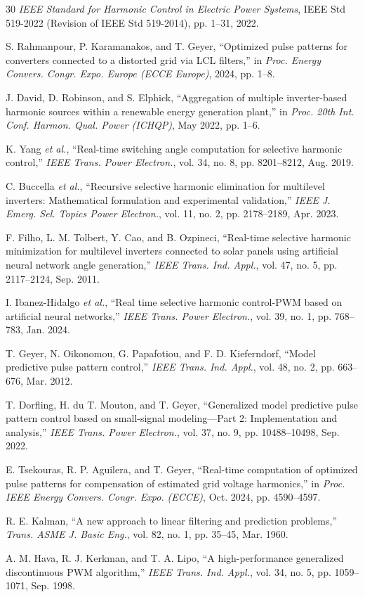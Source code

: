\documentclass[conference]{IEEEtran}
\begin{document}
\begin{thebibliography}{30}
\emph{IEEE Standard for Harmonic Control in Electric Power Systems}, IEEE Std
519-2022 (Revision of IEEE Std 519-2014), pp. 1--31, 2022.

S. Rahmanpour, P. Karamanakos, and T. Geyer, ``Optimized pulse patterns for
converters connected to a distorted grid via LCL filters,'' in \emph{Proc.
Energy Convers. Congr. Expo. Europe (ECCE Europe)}, 2024, pp. 1--8.

J. David, D. Robinson, and S. Elphick, ``Aggregation of multiple inverter-based
harmonic sources within a renewable energy generation plant,'' in \emph{Proc.
20th Int. Conf. Harmon. Qual. Power (ICHQP)}, May 2022, pp. 1--6.

K. Yang \emph{et al.}, ``Real-time switching angle computation for selective
harmonic control,'' \emph{IEEE Trans. Power Electron.}, vol. 34, no. 8,
pp. 8201--8212, Aug. 2019.

C. Buccella \emph{et al.}, ``Recursive selective harmonic elimination for
multilevel inverters: Mathematical formulation and experimental validation,''
\emph{IEEE J. Emerg. Sel. Topics Power Electron.}, vol. 11, no. 2,
pp. 2178--2189, Apr. 2023.

F. Filho, L. M. Tolbert, Y. Cao, and B. Ozpineci, ``Real-time selective harmonic
minimization for multilevel inverters connected to solar panels using artificial
neural network angle generation,'' \emph{IEEE Trans. Ind. Appl.}, vol. 47, no. 5,
pp. 2117--2124, Sep. 2011.

I. Ibanez-Hidalgo \emph{et al.}, ``Real time selective harmonic control-PWM based
on artificial neural networks,'' \emph{IEEE Trans. Power Electron.}, vol. 39, no.
1, pp. 768--783, Jan. 2024.

T. Geyer, N. Oikonomou, G. Papafotiou, and F. D. Kieferndorf, ``Model
predictive pulse pattern control,'' \emph{IEEE Trans. Ind. Appl.}, vol. 48,
no. 2, pp. 663--676, Mar. 2012.

T. Dorfling, H. du T. Mouton, and T. Geyer, ``Generalized model predictive
pulse pattern control based on small-signal modeling---Part 2: Implementation
and analysis,'' \emph{IEEE Trans. Power Electron.}, vol. 37, no. 9,
pp. 10488--10498, Sep. 2022.

E. Tsekouras, R. P. Aguilera, and T. Geyer, ``Real-time computation of
optimized pulse patterns for compensation of estimated grid voltage
harmonics,'' in \emph{Proc. IEEE Energy Convers. Congr. Expo. (ECCE)}, Oct.
2024, pp. 4590--4597.

R. E. Kalman, ``A new approach to linear filtering and prediction
problems,'' \emph{Trans. ASME J. Basic Eng.}, vol. 82, no. 1, pp. 35--45,
Mar. 1960.

A. M. Hava, R. J. Kerkman, and T. A. Lipo, ``A high-performance generalized
discontinuous PWM algorithm,'' \emph{IEEE Trans. Ind. Appl.}, vol. 34, no. 5,
pp. 1059--1071, Sep. 1998.

\end{thebibliography}
\end{document}
